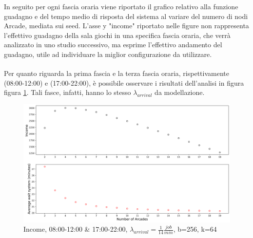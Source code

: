\documentclass{article}
\begin{document}
In seguito per ogni fascia oraria viene riportato il grafico relativo alla funzione guadagno e del tempo medio di risposta del sistema al variare del numero di nodi Arcade, mediata sui seed. L'asse y "income" riportato nelle figure non rappresenta l'effettivo guadagno della sala giochi in una specifica fascia oraria, che verrà analizzato in uno studio successivo, ma esprime l'effettivo andamento del guadagno, utile ad individuare la miglior configurazione da utilizzare.
\\ \\
Per quanto riguarda la prima fascia e la terza fascia oraria, rispettivamente (08:00-12:00) e (17:00-22:00), è possibile osservare i risultati dell'analisi in figura  figura \ref{figura:avg_wait_sys_mor}. Tali fasce, infatti, hanno lo stesso $\lambda_{arrival}$ da modellazione.
\begin{figure}[H]
	\centering
	\captionsetup{justification=centering,margin=2cm}
	\includegraphics[scale=0.48]{images/avg_wait_sys_mor.png}
	\caption{Income, 08:00-12:00 \& 17:00-22:00, $\lambda_{arrival}=\frac{1}{14} \frac{job}{min}$, b=256, k=64}\label{figura:avg_wait_sys_mor}
\end{figure}
\end{document}
